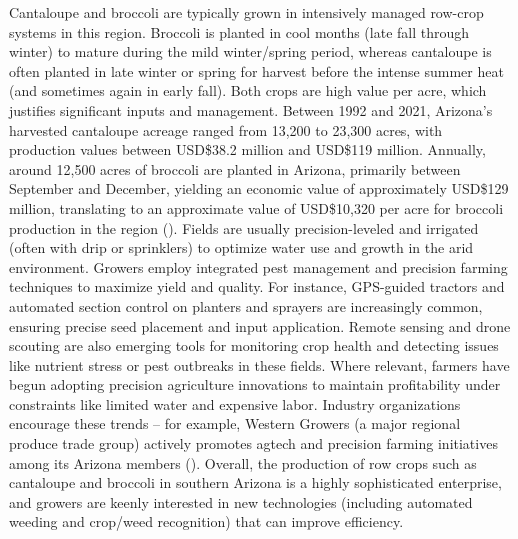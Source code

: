 \documentclass[letterpaper, notitlepage]{report}
\begin{document}
Cantaloupe and broccoli are typically grown in intensively managed row-crop systems in this region. Broccoli is planted in cool months (late fall through winter) to mature during the mild winter/spring period, whereas cantaloupe is often planted in late winter or spring for harvest before the intense summer heat (and sometimes again in early fall). Both crops are high value per acre, which justifies significant inputs and management. Between 1992 and 2021, Arizona's harvested cantaloupe acreage ranged from 13,200 to 23,300 acres, with production values between USD\$38.2 million and USD\$119 million. Annually, around 12,500 acres of broccoli are planted in Arizona, primarily between September and December, yielding an economic value of approximately USD\$129 million, translating to an approximate value of USD\$10,320 per acre for broccoli production in the region (\cite{YCEDA2024-rt}). Fields are usually precision-leveled and irrigated (often with drip or sprinklers) to optimize water use and growth in the arid environment. Growers employ integrated pest management and precision farming techniques to maximize yield and quality. For instance, GPS-guided tractors and automated section control on planters and sprayers are increasingly common, ensuring precise seed placement and input application. Remote sensing and drone scouting are also emerging tools for monitoring crop health and detecting issues like nutrient stress or pest outbreaks in these fields. Where relevant, farmers have begun adopting precision agriculture innovations to maintain profitability under constraints like limited water and expensive labor. Industry organizations encourage these trends – for example, Western Growers (a major regional produce trade group) actively promotes agtech and precision farming initiatives among its Arizona members (\cite{Arizona-Department-of-Agriculture2018-dx}). Overall, the production of row crops such as cantaloupe and broccoli in southern Arizona is a highly sophisticated enterprise, and growers are keenly interested in new technologies (including automated weeding and crop/weed recognition) that can improve efficiency.
\end{document}
